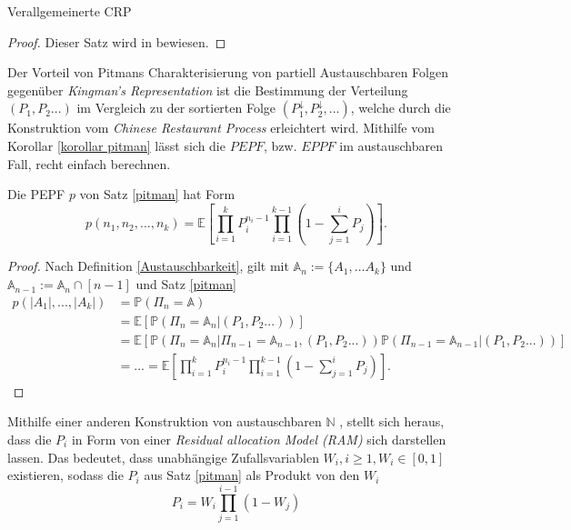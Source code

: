 \begin{section}{Verallgemeinerte CRP}
\begin{proof}
    Dieser Satz wird in \cite{pitman1995exchangeable} bewiesen.
\end{proof}
\begin{Bemerkung}
    Der Vorteil von Pitmans Charakterisierung von partiell Austauschbaren Folgen gegenüber \textit{Kingman's Representation} ist die Bestimmung der Verteilung $(P_1,P_2...)$ im Vergleich zu der sortierten Folge $(P^\downarrow_1,P^\downarrow_2,...)$, welche durch die Konstruktion vom \textit{Chinese Restaurant Process} erleichtert wird. Mithilfe vom Korollar \ref{korollar pitman} lässt sich die $PEPF$, bzw. $EPPF$ im austauschbaren Fall, recht einfach berechnen.
\end{Bemerkung}
\begin{Korollar}
    \label{korollar pitman}
    Die PEPF $p$ von Satz \ref{pitman} hat Form
    \begin{equation}
    \label{PEPF expected value}    
    p(n_1,n_2,...,n_k) = \mathbb{E}\left[\prod_{i=1}^{k}P_i^{n_i-1}\prod_{i=1}^{k-1}(1-\sum_{j=1}^{i}P_j)\right].
    \end{equation}
\end{Korollar}
\begin{proof}
    Nach Definition \ref{Austauschbarkeit}, gilt mit $\mathbb{A}_n:= \{A_1,...A_k\}$ und $\mathbb{A}_{n-1}:= \mathbb{A}_n \cap [n-1]$ und Satz \ref{pitman}
    \begin{align*}
    p(|A_1|,...,|A_k|) &= \mathbb{P}(\Pi_n = \mathbb{A}) \\
    &= \mathbb{E}\left[\mathbb{P}(\Pi_n = \mathbb{A}_n|(P_1,P_2...))\right]  \\
    &= \mathbb{E}\left[\mathbb{P}(\Pi_n = \mathbb{A}_n|\Pi_{n-1} = \mathbb{A}_{n-1},(P_1,P_2...))\mathbb{P}(\Pi_{n-1} = \mathbb{A}_{n-1}|(P_1,P_2...))\right] \\
    &=... =  \mathbb{E}\left[\prod_{i=1}^{k}P_i^{n_i-1}\prod_{i=1}^{k-1}(1-\sum_{j=1}^{i}P_j)\right].
\end{align*}
\end{proof}
Mithilfe einer anderen Konstruktion von austauschbaren $\mathbb{N}$ \cite[Konstruktion 16]{pitman1995exchangeable}, stellt sich heraus, dass die $P_i$ in Form von einer \textit{Residual allocation Model (RAM)} sich darstellen lassen. Das bedeutet, dass unabhängige Zufallsvariablen $W_i, i \geq 1, W_i \in [0,1]$ existieren, sodass die $P_i$ aus Satz \ref{pitman} als Produkt von den $W_i$
\begin{equation}
    \label{RAM probability}
    P_i = W_i\prod_{j=1}^{i-1} (1-W_j)
\end{equation}

\end{section}
